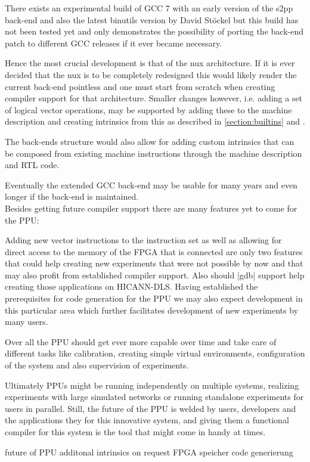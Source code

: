 There exists an experimental build of GCC 7 with an early version of the s2pp back-end and also the latest binutils version by David Stöckel but this build has not been tested yet and only demonstrates the possibility of porting the back-end patch to different GCC releases if it ever became necessary.

Hence the most crucial development is that of the nux architecture.
If it is ever decided that the nux is to be completely redesigned this would likely render the current back-end pointless and one must start from scratch when creating compiler support for that architecture.
Smaller changes however, i.e. adding a set of logical vector operations, may be supported by adding these to the machine description and creating intrinsics from this as described in \ref{section:builtins} and \citep{heimbrecht}.

The back-ends structure would also allow for adding custom intrinsics that can be composed from existing machine instructions through the machine description and RTL code.

Eventually the extended GCC back-end may be usable for many years and even longer if the back-end is maintained.
\\
Besides getting future compiler support there are many features yet to come for the PPU:

Adding new vector instructions to the instruction set as well as allowing for direct access to the memory of the FPGA that is connected are only two features that could help creating new experiments that were not possible by now and that may also profit from established compiler support.
Also should |gdb| support help creating those applications on HICANN-DLS.
Having established the prerequisites for code generation for the PPU we may also expect development in this particular area which further facilitates development of new experiments by many users.

Over all the PPU should get ever more capable over time and take care of different tasks like calibration, creating simple virtual environments, configuration of the system and also supervision of experiments.

Ultimately PPUs might be running independently on multiple systems, realizing experiments with large simulated networks or running standalone experiments for users in parallel.
Still, the future of the PPU is welded by users, developers and the applications they for this innovative system, and giving them a functional compiler for this system is the tool that might come in handy at times.




future of PPU
additonal intrinsics on request
FPGA speicher
code generierung
